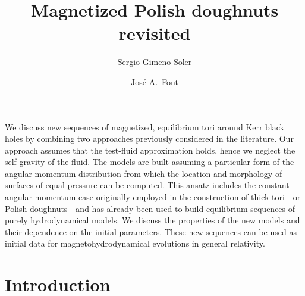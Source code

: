 \documentclass{aa}
\begin{document}
 

\title{Magnetized Polish doughnuts revisited}

   \author{Sergio Gimeno-Soler   \and Jos\'e A.~Font }


   \date{}
 
  \abstract
{We discuss new sequences of magnetized, equilibrium tori around Kerr black holes by combining two approaches previously considered in the literature. Our approach assumes that the test-fluid approximation holds, hence we neglect the self-gravity of the fluid. The models are built assuming a particular form of the angular momentum distribution from which the location and morphology of surfaces of equal pressure can be computed. This ansatz includes the  constant angular momentum case originally employed in the construction of thick tori - or Polish doughnuts - and has already been used to build equilibrium sequences of purely hydrodynamical models. We discuss the properties of the new models and their dependence on the initial parameters. These new sequences can be used as initial data for magnetohydrodynamical evolutions in general relativity.}


   \maketitle

\section{Introduction}

\end{document}
